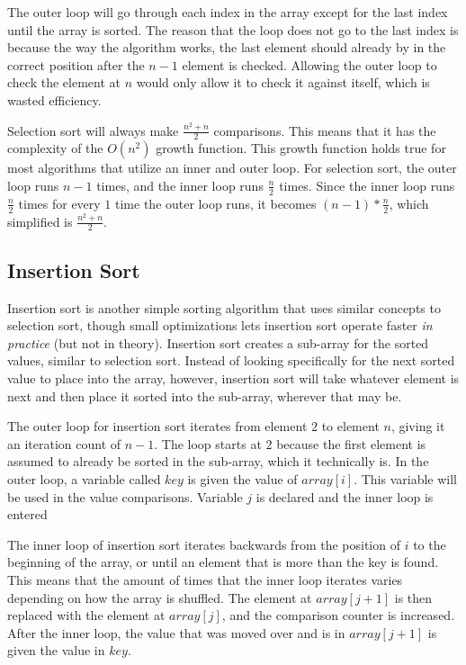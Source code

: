 \documentclass[letterpaper, 10pt,DIV=13]{scrartcl}
\numberwithin{equation}{section} %
\numberwithin{figure}{section} %
\numberwithin{table}{section} %
\begin{document}
The outer loop will go through each index in the array except for the last index until the array is sorted. The reason that the loop does not go to the last index is because the way the algorithm works, the last element should already by in the correct position after the $n-1$ element is checked. Allowing the outer loop to check the element at $n$ would only allow it to check it against itself, which is wasted efficiency.

Selection sort will always make $\frac{n^2 + n}{2}$ comparisons. This means that it has the complexity of the $O(n^2)$ growth function. This growth function holds true for most algorithms that utilize an inner and outer loop. For selection sort, the outer loop runs $n - 1$ times, and the inner loop runs $\frac{n}{2}$ times. Since the inner loop runs $\frac{n}{2}$ times for every $1$ time the outer loop runs, it becomes $(n - 1) * \frac{n}{2}$, which simplified is $\frac{n^2 + n}{2}$.

\subsection{Insertion Sort}
Insertion sort is another simple sorting algorithm that uses similar concepts to selection sort, though small optimizations lets insertion sort operate faster \textit{in practice} (but not in theory). Insertion sort creates a sub-array for the sorted values, similar to selection sort. Instead of looking specifically for the next sorted value to place into the array, however, insertion sort will take whatever element is next and then place it sorted into the sub-array, wherever that may be.

The outer loop for insertion sort iterates from element $2$ to element $n$, giving it an iteration count of $n-1$. The loop starts at $2$ because the first element is assumed to already be sorted in the sub-array, which it technically is. In the outer loop, a variable called $key$ is given the value of $array[i]$. This variable will be used in the value comparisons. Variable $j$ is declared and the inner loop is entered

The inner loop of insertion sort iterates backwards from the position of $i$ to the beginning of the array, or until an element that is more than the key is found. This means that the amount of times that the inner loop iterates varies depending on how the array is shuffled. The element at $array[j + 1]$ is then replaced with the element at $array[j]$, and the comparison counter is increased. After the inner loop, the value that was moved over and is in $array[j + 1]$ is given the value in $key$.
\end{document}
